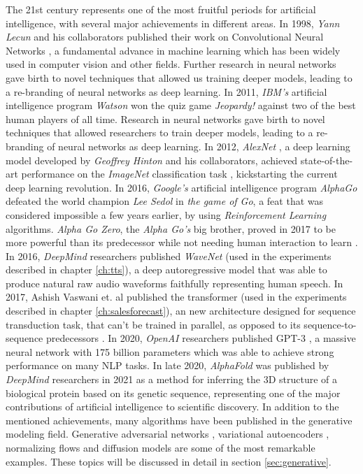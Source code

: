 The 21st century represents one of the most fruitful periods for artificial intelligence, with several major achievements in different areas. In 1998, \textit{Yann Lecun} and his collaborators published their work on Convolutional Neural Networks \autocite{lecun1999}, a fundamental advance in machine learning which has been widely used in computer vision and other fields. Further research in neural networks \autocite{hinton2006, hinton2012} gave birth to novel techniques that allowed us training deeper models, leading to a re-branding of neural networks as deep learning. In 2011, \textit{IBM's} artificial intelligence program \textit{Watson} won the quiz game \textit{Jeopardy!} against two of the best human players of all time. Research in neural networks gave birth to novel techniques that allowed researchers to train deeper models, leading to a re-branding of neural networks as deep learning. In 2012, \textit{AlexNet} \autocite{krizhevsky2012}, a deep learning model developed by \textit{Geoffrey Hinton} and his collaborators, achieved state-of-the-art performance on the \textit{ImageNet} classification task \autocite{ILSVRC15}, kickstarting the current deep learning revolution. In 2016, \textit{Google's} artificial intelligence program \textit{AlphaGo} \autocite{silver2016} defeated the world champion \textit{Lee Sedol} in \textit{the game of Go}, a feat that was considered impossible a few years earlier, by using \textit{Reinforcement Learning} algorithms. \textit{Alpha Go Zero}, the \textit{Alpha Go's} big brother, proved in 2017 to be more powerful than its predecessor while not needing human interaction to learn \autocite{Silver2017a, Silver2017b}. In 2016, \textit{DeepMind} researchers published \textit{WaveNet} \autocite{vanderoord2016} (used in the experiments described in chapter \ref{ch:tts}), a deep autoregressive model that was able to produce natural raw audio waveforms faithfully representing human speech. In 2017, Ashish Vaswani et. al published the transformer \autocite{vaswani2017} (used in the experiments described in chapter \ref{ch:salesforecast}), an new architecture designed for sequence transduction task, that can't be trained in parallel, as opposed to its sequence-to-sequence predecessors \autocite{sutskever2014}. In 2020, \textit{OpenAI} researchers published GPT-3 \autocite{brown2020}, a massive neural network with 175 billion parameters which was able to achieve strong performance on many NLP tasks. In late 2020, \textit{AlphaFold} was published by \textit{DeepMind} researchers in 2021 \autocite{Jumper2021} as a method for inferring the 3D structure of a biological protein based on its genetic sequence, representing one of the major contributions of artificial intelligence to scientific discovery. In addition to the mentioned achievements, many algorithms have been published in the generative modeling field. Generative adversarial networks \autocite{Goodfellow2014}, variational autoencoders \autocite{kingma2019}, normalizing flows \autocite{kingma2016, kobyzev} and diffusion models \autocite{Prafulla2021} are some of the most remarkable examples. These topics will be discussed in detail in section \ref{sec:generative}.

